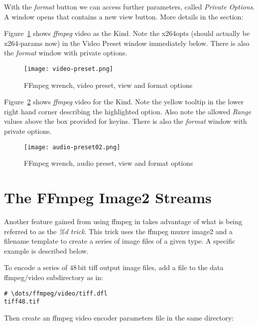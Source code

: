 With the \textit{format} button we can access further parameters, called \textit{Private Options}. A window opens that contains a new view button. More details in the section: 

Figure~\ref{fig:video-preset} shows \textit{ffmpeg} video as the Kind. Note the x264opts (should actually be x264-params now) in the Video Preset window immediately below. There is also the \textit{format} window with private options.

\begin{figure}[htpb]
    \centering
    \texttt{[image: video-preset.png]}
    \caption{FFmpeg wrench, video preset, view and format options}
    \label{fig:video-preset}
\end{figure}

Figure~\ref{fig:audio-preset02} shows \textit{ffmpeg} video for the Kind. Note the yellow tooltip in the lower right hand corner describing the highlighted option.  Also note the allowed \textit{Range} values above the box provided for keyins. There is also the \textit{format} window with private options.

\begin{figure}[htpb]
    \centering
    \texttt{[image: audio-preset02.png]}
    \caption{FFmpeg wrench, audio preset, view and format options}
    \label{fig:audio-preset02}
\end{figure}

\section{The FFmpeg Image2 Streams}%
\label{sec:ffmpeg_image2_streams}

Another feature gained from using ffmpeg in \CGG{} takes advantage of what is being referred to as the \textit{\%d trick}.  This trick uses the ffmpeg muxer image2 and a filename template to create a series of image files of a given type.  A specific example is described below.

To encode a series of $48$\,bit tiff output image files, add a file to the \CGG{} data ffmpeg/video subdirectory as in:

\begin{lstlisting}[style=sh]
# \dots/ffmpeg/video/tiff.dfl
tiff48.tif
\end{lstlisting}

Then create an ffmpeg video encoder parameters file in the same directory:

